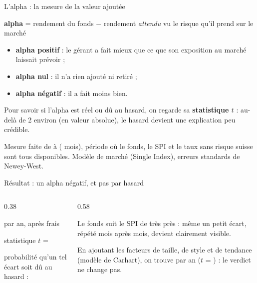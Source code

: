 \documentclass[aspectratio=169,11pt]{beamer}
\newcommand{\gros}[2]{{\color{#1}\bfseries\LARGE #2}}
\begin{document}
\begin{frame}{L'alpha : la mesure de la valeur ajoutée}
  \begin{cle}
    \centering
    \textbf{alpha} = rendement du fonds $-$ rendement \emph{attendu} vu le risque qu'il prend sur le marché
  \end{cle}
  \begin{itemize}
    \item \textbf{alpha positif} : le gérant a fait mieux que ce que son exposition au marché laissait prévoir ;
    \item \textbf{alpha nul} : il n'a rien ajouté ni retiré ;
    \item \textbf{alpha négatif} : il a fait moins bien.
  \end{itemize}
  Pour savoir si l'alpha est réel ou dû au hasard, on regarde sa \textbf{statistique $t$} : au-delà de 2 environ (en valeur absolue), le hasard devient une explication peu crédible.

  {\small\color{gris} Mesure faite de \PeriodeDebut{} à \PeriodeFin{} (\NObs{} mois), période où le fonds, le SPI et le taux sans risque suisse sont tous disponibles. Modèle de marché (Single Index), erreurs standards de Newey-West.}
\end{frame}

\begin{frame}{Résultat : un alpha négatif, et pas par hasard}
  \begin{columns}[c]
    \begin{column}{0.38\textwidth}
      \centering
      \gros{orange}{\AlphaNet}\par
      {\small par an, après frais}\par\medskip
      {\small statistique $t$ = \AlphaNetT}\par
      {\scriptsize\color{gris} probabilité qu'un tel écart soit dû au hasard : \AlphaNetP}
    \end{column}
    \begin{column}{0.58\textwidth}
      \AlphaNetLecture

      Le fonds suit le SPI de très près : même un petit écart, répété mois après mois, devient clairement visible.

      {\small En ajoutant les facteurs de taille, de style et de tendance (modèle de Carhart), on trouve \AlphaCarNet{} par an ($t$ = \AlphaCarNetT) : le verdict ne change pas.}
    \end{column}
  \end{columns}
\end{frame}
\end{document}
